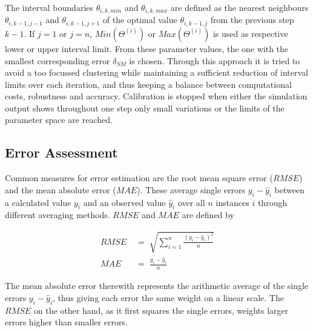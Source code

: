 \noindent The interval boundaries $\theta_{i,k,min}$ and $\theta_{i,k,max}$ are defined as the nearest neighbours $\theta_{i,k-1,j-1}$ and $\theta_{i,k-1,j+1}$ of the optimal value $\theta_{i,k-1,j}$ from the previous step $k-1$. 
If $j=1$ or $j=n$, $Min(\Theta^{(i)})$ or $Max(\Theta^{(i)})$ is used as respective lower or upper interval limit. 
From these parameter values, the one with the smallest corresponding error $\delta_{SM}$ is chosen. 
Through this approach it is tried to avoid a too focussed clustering while maintaining a sufficient reduction of interval limits over each iteration, and thus keeping a balance between computational costs, robustness and accuracy. 
Calibration is stopped when either the simulation output shows throughout one step only small variations or the limits of the parameter space are reached.

\subsection{Error Assessment}
\label{Sec-SubMethErrAss}

Common measures for error estimation are the root mean square error ($RMSE$) and the mean absolute error ($MAE$). 
These average single errors $y_i - \hat{y}_i$ between a calculated value $y_i$ and an observed value $\hat{y}_i$ over all $n$ instances $i$ through different averaging methods. 
$RMSE$ and $MAE$ are defined by

\begin{align}
    RMSE \; & = \; \sqrt{ \sum_{i=1}^{n} \frac{(y_i - \hat{y}_i)^2}{n} } \label{Eq-RMSE}\\
    MAE \; & = \; \frac{y_i - \hat{y}_i }{n} \label{MAE}
\end{align}


\noindent The mean absolute error therewith represents the arithmetic average of the single errors $y_i-\hat{y}_i$, thus giving each error the same weight on a linear scale. 
The $RMSE$ on the other hand, as it first squares the single errors, weights larger errors higher than smaller errors.

